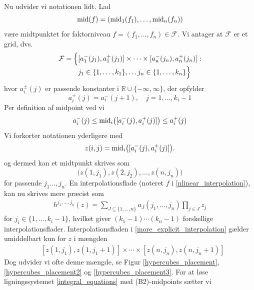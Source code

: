 \documentclass[a4paper, 12pt]{memoir}
\begin{document}
Nu udvider vi notationen lidt. Lad 
\begin{equation}
\textup{mid}(f)=(\textup{mid}_1(f_1), \dots, \textup{mid}_n(f_n))
\end{equation}
være midtpunktet for faktorniveau $f=(f_1, \dots, f_n)\in \mathcal F$. Vi antager at $\mathcal F$ er et grid, dvs.
\begin{equation}
\mathcal F= \Bigl\{\begin{lgathered}[t] [a_1^-(j_1), a_1^+(j_1)]\times \cdots \times [a_n^-(j_n), a_n^+(j_n)]:\\
j_1\in \{1, \dots, k_1\}, \dots j_n\in \{1, \dots, k_n\}\Bigr\}\end{lgathered}
\end{equation}
hvor $a_i^{\pm}(j)$ er passende konstanter i $\mathbb R \cup \{-\infty, \infty\}$, der opfylder
\begin{equation*}
a_i^+(j)=a_i^-(j+1), \quad j=1, \dots, k_i-1
\end{equation*}
Per definition af midpoint ved vi
\begin{equation}
a_i^-(j)\leq \textup{mid}_i\bigl([a_i^-(j), a_i^+(j)]\bigr) \leq a_i^+(j)
\end{equation}
Vi forkorter notationen yderligere med 
\begin{equation*}
z(i,j)=\textup{mid}_i\bigl([a_i^-(j), a_i^+(j)]\bigr).
\end{equation*}
og dermed kan et midtpunkt skrives som
\begin{equation}
\bigl(z(1,j_1), z(2,j_2), \dots, z(n, j_n)\bigr)
\end{equation}
for passende $j_1\dots, j_n $. En interpolationsflade (noteret $f$ i \eqref{nlinear_interpolation}), kan nu skrives mere præcist som
\begin{align}
h^{j_1, \dots, j_n}(z)=\sum_{J\subseteq\{1, \dots, n\}} a_J(j_1, \dots, j_n) \prod_{j\in J} z_j \label{more_explicit_interpolation}
\end{align}
for $j_i\in \{1, \dots, k_{i}-1\}$, hvilket giver $(k_1-1)\cdots (k_n-1)$ forskellige interpolationsflader. Interpolationsfladen i  \eqref{more_explicit_interpolation} gælder umiddelbart kun for $z$ i mængden
\begin{align}
& [z(1,j_1), z(1,j_1+1)]\times \cdots \times [z(n,j_n), z(n,j_n+1)]
\end{align}
Dog udvider vi ofte denne mængde, se Figur \ref{hypercubes_placement}, \ref{hypercubes_placement2} og \ref{hypercubes_placement3}. For at løse ligningssystemet \eqref{integral_equations} med (B2)-midpoints sætter vi
\end{document}
